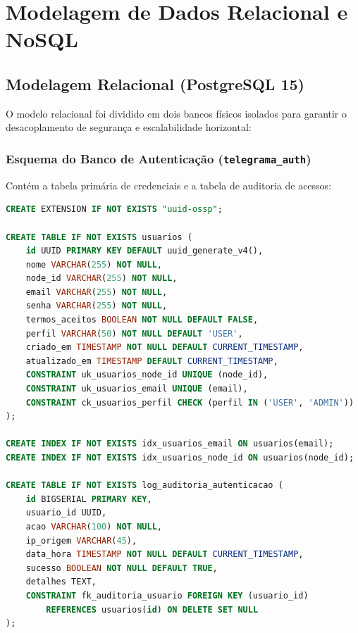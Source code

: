 \documentclass[12pt,a4paper]{report}
\begin{document}
\chapter{Modelagem de Dados Relacional e NoSQL}

\section{Modelagem Relacional (PostgreSQL 15)}
O modelo relacional foi dividido em dois bancos físicos isolados para garantir o desacoplamento de segurança e escalabilidade horizontal:

\subsection{Esquema do Banco de Autenticação (\texttt{telegrama\_auth})}
Contém a tabela primária de credenciais e a tabela de auditoria de acessos:
\begin{lstlisting}[language=SQL, caption={DDL de Autenticação e Auditoria}]
CREATE EXTENSION IF NOT EXISTS "uuid-ossp";

CREATE TABLE IF NOT EXISTS usuarios (
    id UUID PRIMARY KEY DEFAULT uuid_generate_v4(),
    nome VARCHAR(255) NOT NULL,
    node_id VARCHAR(255) NOT NULL,
    email VARCHAR(255) NOT NULL,
    senha VARCHAR(255) NOT NULL,
    termos_aceitos BOOLEAN NOT NULL DEFAULT FALSE,
    perfil VARCHAR(50) NOT NULL DEFAULT 'USER',
    criado_em TIMESTAMP NOT NULL DEFAULT CURRENT_TIMESTAMP,
    atualizado_em TIMESTAMP DEFAULT CURRENT_TIMESTAMP,
    CONSTRAINT uk_usuarios_node_id UNIQUE (node_id),
    CONSTRAINT uk_usuarios_email UNIQUE (email),
    CONSTRAINT ck_usuarios_perfil CHECK (perfil IN ('USER', 'ADMIN'))
);

CREATE INDEX IF NOT EXISTS idx_usuarios_email ON usuarios(email);
CREATE INDEX IF NOT EXISTS idx_usuarios_node_id ON usuarios(node_id);

CREATE TABLE IF NOT EXISTS log_auditoria_autenticacao (
    id BIGSERIAL PRIMARY KEY,
    usuario_id UUID,
    acao VARCHAR(100) NOT NULL,
    ip_origem VARCHAR(45),
    data_hora TIMESTAMP NOT NULL DEFAULT CURRENT_TIMESTAMP,
    sucesso BOOLEAN NOT NULL DEFAULT TRUE,
    detalhes TEXT,
    CONSTRAINT fk_auditoria_usuario FOREIGN KEY (usuario_id)
        REFERENCES usuarios(id) ON DELETE SET NULL
);
\end{lstlisting}
\end{document}
